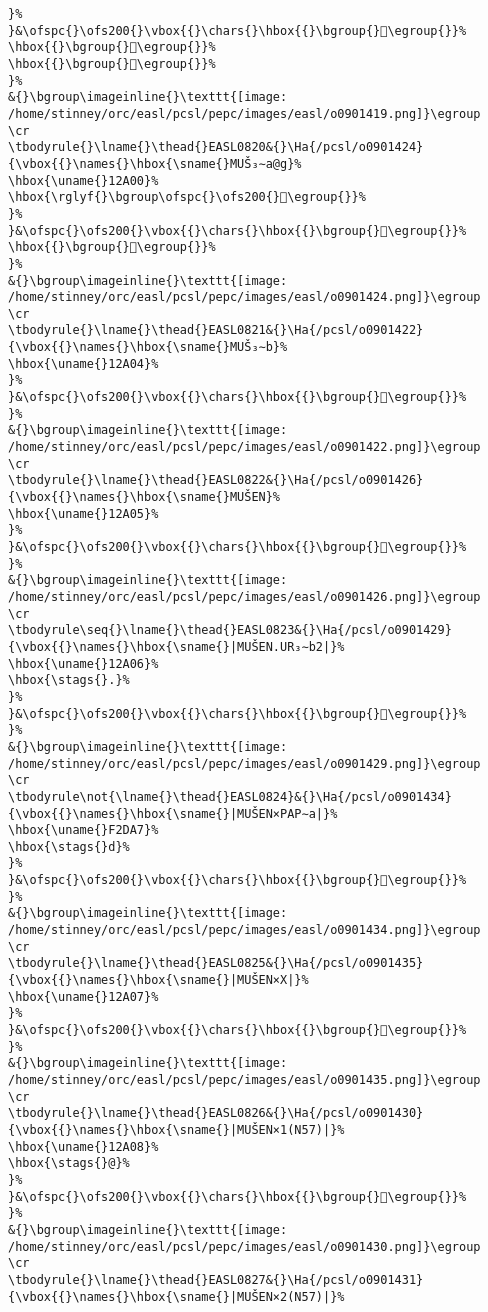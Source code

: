 \begin{verbatim}
}%
}&\ofspc{}\ofs200{}\vbox{{}\chars{}\hbox{{}\bgroup{}𒧿\egroup{}}%
\hbox{{}\bgroup{}𒨂\egroup{}}%
\hbox{{}\bgroup{}𒨃\egroup{}}%
}%
&{}\bgroup\imageinline{}\texttt{[image: /home/stinney/orc/easl/pcsl/pepc/images/easl/o0901419.png]}\egroup
\cr
\tbodyrule{}\lname{}\thead{}EASL0820&{}\Ha{/pcsl/o0901424}{\vbox{{}\names{}\hbox{\sname{}MUŠ₃∼a@g}%
\hbox{\uname{}12A00}%
\hbox{\rglyf{}\bgroup\ofspc{}\ofs200{}𒨀\egroup{}}%
}%
}&\ofspc{}\ofs200{}\vbox{{}\chars{}\hbox{{}\bgroup{}𒨀\egroup{}}%
\hbox{{}\bgroup{}𒨁\egroup{}}%
}%
&{}\bgroup\imageinline{}\texttt{[image: /home/stinney/orc/easl/pcsl/pepc/images/easl/o0901424.png]}\egroup
\cr
\tbodyrule{}\lname{}\thead{}EASL0821&{}\Ha{/pcsl/o0901422}{\vbox{{}\names{}\hbox{\sname{}MUŠ₃∼b}%
\hbox{\uname{}12A04}%
}%
}&\ofspc{}\ofs200{}\vbox{{}\chars{}\hbox{{}\bgroup{}𒨄\egroup{}}%
}%
&{}\bgroup\imageinline{}\texttt{[image: /home/stinney/orc/easl/pcsl/pepc/images/easl/o0901422.png]}\egroup
\cr
\tbodyrule{}\lname{}\thead{}EASL0822&{}\Ha{/pcsl/o0901426}{\vbox{{}\names{}\hbox{\sname{}MUŠEN}%
\hbox{\uname{}12A05}%
}%
}&\ofspc{}\ofs200{}\vbox{{}\chars{}\hbox{{}\bgroup{}𒨅\egroup{}}%
}%
&{}\bgroup\imageinline{}\texttt{[image: /home/stinney/orc/easl/pcsl/pepc/images/easl/o0901426.png]}\egroup
\cr
\tbodyrule\seq{}\lname{}\thead{}EASL0823&{}\Ha{/pcsl/o0901429}{\vbox{{}\names{}\hbox{\sname{}|MUŠEN.UR₃∼b2|}%
\hbox{\uname{}12A06}%
\hbox{\stags{}.}%
}%
}&\ofspc{}\ofs200{}\vbox{{}\chars{}\hbox{{}\bgroup{}𒨆\egroup{}}%
}%
&{}\bgroup\imageinline{}\texttt{[image: /home/stinney/orc/easl/pcsl/pepc/images/easl/o0901429.png]}\egroup
\cr
\tbodyrule\not{\lname{}\thead{}EASL0824}&{}\Ha{/pcsl/o0901434}{\vbox{{}\names{}\hbox{\sname{}|MUŠEN×PAP∼a|}%
\hbox{\uname{}F2DA7}%
\hbox{\stags{}d}%
}%
}&\ofspc{}\ofs200{}\vbox{{}\chars{}\hbox{{}\bgroup{}󲶧\egroup{}}%
}%
&{}\bgroup\imageinline{}\texttt{[image: /home/stinney/orc/easl/pcsl/pepc/images/easl/o0901434.png]}\egroup
\cr
\tbodyrule{}\lname{}\thead{}EASL0825&{}\Ha{/pcsl/o0901435}{\vbox{{}\names{}\hbox{\sname{}|MUŠEN×X|}%
\hbox{\uname{}12A07}%
}%
}&\ofspc{}\ofs200{}\vbox{{}\chars{}\hbox{{}\bgroup{}𒨇\egroup{}}%
}%
&{}\bgroup\imageinline{}\texttt{[image: /home/stinney/orc/easl/pcsl/pepc/images/easl/o0901435.png]}\egroup
\cr
\tbodyrule{}\lname{}\thead{}EASL0826&{}\Ha{/pcsl/o0901430}{\vbox{{}\names{}\hbox{\sname{}|MUŠEN×1(N57)|}%
\hbox{\uname{}12A08}%
\hbox{\stags{}@}%
}%
}&\ofspc{}\ofs200{}\vbox{{}\chars{}\hbox{{}\bgroup{}𒨈\egroup{}}%
}%
&{}\bgroup\imageinline{}\texttt{[image: /home/stinney/orc/easl/pcsl/pepc/images/easl/o0901430.png]}\egroup
\cr
\tbodyrule{}\lname{}\thead{}EASL0827&{}\Ha{/pcsl/o0901431}{\vbox{{}\names{}\hbox{\sname{}|MUŠEN×2(N57)|}%

\end{verbatim}
